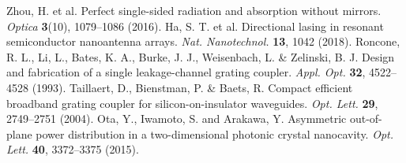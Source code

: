 \documentclass[%
 reprint,
superscriptaddress,
 amsmath,amssymb, aps,
]{revtex4-1}
\begin{document}
\begin{thebibliography}{1}
 Zhou, H. et al. Perfect single-sided radiation and absorption without mirrors. \emph{Optica} {\bf 3}(10), 1079--1086 (2016).
   Ha, S. T. et al. Directional lasing in resonant semiconductor nanoantenna arrays. \emph{Nat. Nanotechnol.} {\bf 13}, 1042 (2018).
 Roncone, R. L., Li, L., Bates, K. A., Burke, J. J., Weisenbach, L. \& Zelinski, B. J. Design and fabrication of a single leakage-channel grating coupler. \emph{Appl. Opt.} {\bf 32}, 4522--4528 (1993).
 Taillaert, D., Bienstman, P. \& Baets, R. Compact efficient broadband grating coupler for silicon-on-insulator waveguides. \emph{Opt. Lett.} {\bf 29}, 2749--2751 (2004).
 Ota, Y., Iwamoto, S. and Arakawa, Y. Asymmetric out-of-plane power distribution in a two-dimensional photonic crystal nanocavity. \emph{Opt. Lett.} {\bf 40}, 3372--3375 (2015).

\end{thebibliography}
\end{document}
